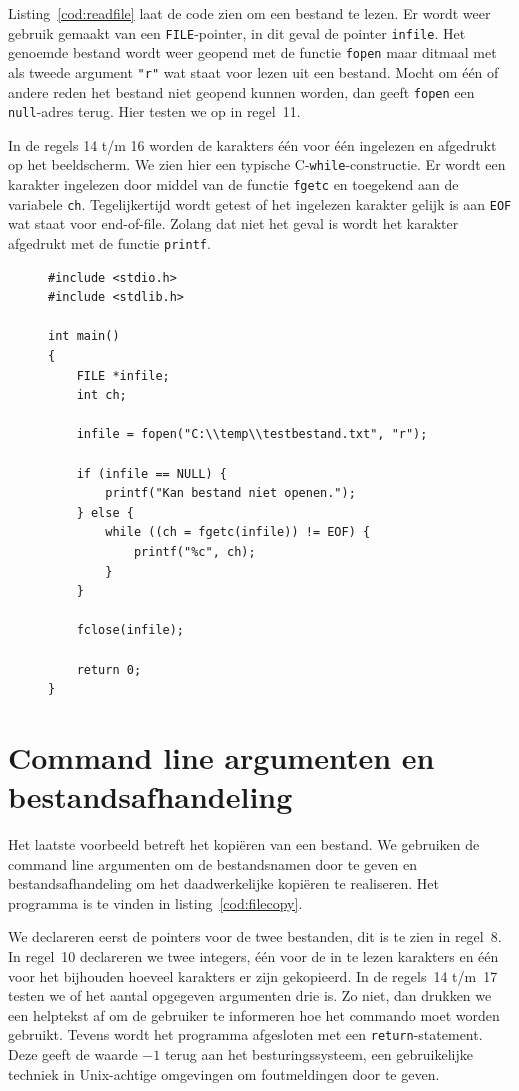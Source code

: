 \documentclass[a4paper,12pt,twoside]{article}
\begin{document}
Listing~\ref{cod:readfile} laat de code zien om een bestand te lezen. Er wordt weer
gebruik gemaakt van een \lstinline|FILE|-pointer, in dit geval de pointer \lstinline|infile|.
Het genoemde bestand wordt weer geopend met de functie \lstinline|fopen| maar ditmaal
met als tweede argument \lstinline|"r"| wat staat voor lezen uit een bestand. Mocht
om \'e\'en of andere reden het bestand niet geopend kunnen worden, dan geeft
\lstinline|fopen| een \lstinline|null|-adres terug. Hier testen we op in regel~11.

In de regels 14 t/m 16 worden de karakters \'e\'en voor \'e\'en ingelezen en
afgedrukt op het beeldscherm. We zien hier een typische C-\lstinline|while|-constructie.
Er wordt
een karakter ingelezen door middel van de functie \lstinline|fgetc| en toegekend
aan de variabele \lstinline|ch|. Tegelijkertijd wordt getest of het ingelezen
karakter gelijk is aan \lstinline|EOF| wat staat voor end-of-file. Zolang dat niet
het geval is wordt het karakter afgedrukt met de functie \lstinline|printf|.

\begin{figure}[!t]
\begin{lstlisting}[caption=Voorbeeld lezen uit een bestand.,label=cod:readfile]
#include <stdio.h>
#include <stdlib.h>

int main()
{
    FILE *infile;
    int ch;

    infile = fopen("C:\\temp\\testbestand.txt", "r");

    if (infile == NULL) {
        printf("Kan bestand niet openen.");
    } else {
        while ((ch = fgetc(infile)) != EOF) {
            printf("%c", ch);
        }
    }
    
    fclose(infile);
    
    return 0;
}
\end{lstlisting}
\end{figure}

\section{Command line argumenten en bestandsafhandeling}
Het laatste voorbeeld betreft het kopi\"eren van een bestand. We gebruiken de
command line argumenten om de bestandsnamen door te geven en bestandsafhandeling
om het daadwerkelijke kopi\"eren te realiseren. Het programma is te vinden
in listing~\ref{cod:filecopy}.

We declareren eerst de pointers voor de twee bestanden, dit is te zien in regel~8.
In regel~10 declareren we twee integers, \'e\'en voor de in te lezen karakters en
\'e\'en voor het bijhouden hoeveel karakters er zijn gekopieerd. In de regels~14
t/m~17 testen we of het aantal opgegeven argumenten drie is. Zo niet, dan drukken
we een helptekst af om de gebruiker te informeren hoe het commando moet worden
gebruikt. Tevens wordt het programma afgesloten met een \lstinline|return|-statement.
Deze geeft de waarde $-1$ terug aan het besturingssysteem, een gebruikelijke techniek
in Unix-achtige omgevingen om foutmeldingen door te geven.
\end{document}
